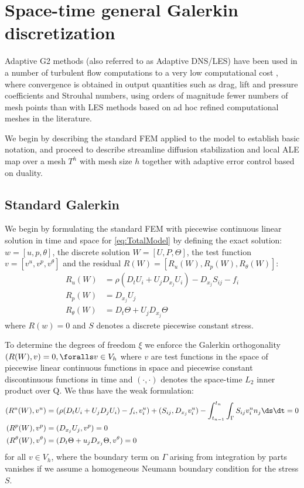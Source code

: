 \section{Space-time general Galerkin discretization}

Adaptive G2 methods (also referred to as
Adaptive DNS/LES) have been used in a number of
turbulent flow computations to a very low computational cost
\citep{Hoffman2005,HoffmanJohnson2006b,Hoffman2006,Hoffman2009,HoffmanJansson2009,VilelaJanssonEtAl2010},
where convergence is obtained in output quantities such as drag,
lift and pressure coefficients and Strouhal numbers, using orders of
magnitude fewer numbers of mesh points than with LES methods based on
ad hoc refined computational meshes in the literature.

We begin by describing the standard FEM applied to the model to establish
basic notation, and proceed to describe streamline diffusion stabilization
and local ALE map over a mesh $T^h$ with mesh size $h$ together with
adaptive error control based on duality.

\subsection{Standard Galerkin}

We begin by formulating the standard \cgone{}\cgone{} FEM
\citep{ErikssonEstepHansboEtAl1996} with piecewise continuous linear
solution in time and space for \ref{eq:TotalModel} by defining the
exact solution: $w = [u, p, \theta]$, the discrete solution $W = [U, P,
\Theta]$, the test function $v = [v^u, v^p, v^\theta]$ and the residual
$R(W) = [R_u(W), R_p(W), R_\theta(W)]$:
\begin{align}
  R_u(W) &= \rho(D_t U_i + U_j D_{x_j} U_i) - D_{x_j} S_{ij} - f_i\\
  R_p(W) &= D_{x_j} U_j\\
  R_\theta(W) &= D_t \Theta + U_j D_{x_j} \Theta
\end{align}
where $R(w) = 0$ and $S$ denotes a discrete piecewise constant stress.

To determine the degrees of freedom $\xi$ we enforce the Galerkin
orthogonality $(R(W), v) = 0, \foralls v \in V_h$ where $v$ are test
functions in the space of piecewise linear continuous functions in space
and piecewise constant discontinuous functions in time and $(\cdot,\cdot)$
denotes the space-time $L_2$ inner product over Q. We thus have the
weak formulation:
\begin{align}
  (R^u(W), v^u) &= (\rho(D_t U_i + U_j D_j U_i) - f_i, v^u_i) + (S_{ij}, D_{x_j} v^u_i) - \int_{t_{n-1}}^{t_n}\int_\Gamma S_{ij} v^u_i n_j \ds \dt = 0\\
  (R^p(W), v^p) &= (D_{x_j} U_j, v^p) = 0\\
  (R^\theta(W), v^\theta) &= (D_t \Theta + u_j D_{x_j} \Theta, v^\theta) = 0
\end{align}
for all $v \in V_h$, where the boundary term on $\Gamma$ arising from
integration by parts vanishes if we assume a homogeneous Neumann boundary
condition for the stress $S$.

